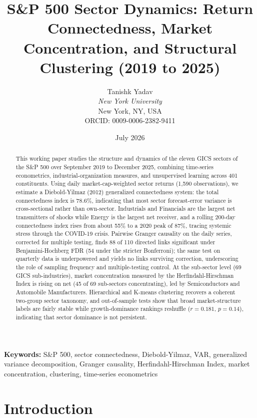 \documentclass[11pt]{article}
\title{\textbf{S\&P 500 Sector Dynamics: Return Connectedness, Market Concentration, and Structural Clustering (2019 to 2025)}}
\author{Tanishk Yadav\\[2pt]\textit{New York University}\\New York, NY, USA\\[2pt]ORCID: 0009-0006-2382-9411}
\date{July 2026}
\begin{document}
\maketitle
\thispagestyle{fancy}

\begin{abstract}
This working paper studies the structure and dynamics of the eleven GICS sectors of the S\&P 500 over September 2019 to December 2025, combining time-series econometrics, industrial-organization measures, and unsupervised learning across 401 constituents. Using daily market-cap-weighted sector returns (1,590 observations), we estimate a Diebold-Yilmaz (2012) generalized connectedness system: the total connectedness index is 78.6\%, indicating that most sector forecast-error variance is cross-sectional rather than own-sector. Industrials and Financials are the largest net transmitters of shocks while Energy is the largest net receiver, and a rolling 200-day connectedness index rises from about 55\% to a 2020 peak of 87\%, tracing systemic stress through the COVID-19 crisis. Pairwise Granger causality on the daily series, corrected for multiple testing, finds 88 of 110 directed links significant under Benjamini-Hochberg FDR (54 under the stricter Bonferroni); the same test on quarterly data is underpowered and yields no links surviving correction, underscoring the role of sampling frequency and multiple-testing control. At the sub-sector level (69 GICS sub-industries), market concentration measured by the Herfindahl-Hirschman Index is rising on net (45 of 69 sub-sectors concentrating), led by Semiconductors and Automobile Manufacturers. Hierarchical and K-means clustering recovers a coherent two-group sector taxonomy, and out-of-sample tests show that broad market-structure labels are fairly stable while growth-dominance rankings reshuffle ($r = 0.181$, $p = 0.14$), indicating that sector dominance is not persistent.
\end{abstract}

\medskip
\noindent\textbf{Keywords:} S\&P 500, sector connectedness, Diebold-Yilmaz, VAR, generalized variance decomposition, Granger causality, Herfindahl-Hirschman Index, market concentration, clustering, time-series econometrics

\section{Introduction}
\end{document}
